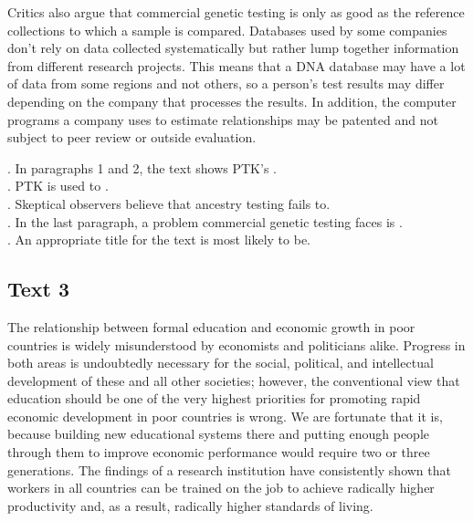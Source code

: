 Critics also argue that commercial genetic testing is only as good as the reference collections to which a sample is compared. Databases used by some companies don’t rely on data collected systematically but rather lump together information from different research projects. This means that a DNA database may have a lot of data from some regions and not others, so a person’s test results may differ depending on the company that processes the results. In addition, the computer programs a company uses to estimate relationships may be patented and not subject to peer review or outside evaluation.
\begin{questions} . In paragraphs 1 and 2, the text shows PTK’s \ltk{}.
\\ . PTK is used to \ltk{}.
\\ . Skeptical observers believe that ancestry testing fails to\ltk{}.
\\ . In the last paragraph, a problem commercial genetic testing faces is \ltk{}.
\\ . An appropriate title for the text is most likely to be\ltk{}.
\\ \end{questions}      \subsection{Text 3}
The relationship between formal education and economic growth in poor countries is widely misunderstood by economists and politicians alike. Progress in both areas is undoubtedly necessary for the social, political, and intellectual development of these and all other societies; however, the conventional view that education should be one of the very highest priorities for promoting rapid economic development in poor countries is wrong. We are fortunate that it is, because building new educational systems there and putting enough people through them to improve economic performance would require two or three generations. The findings of a research institution have consistently shown that workers in all countries can be trained on the job to achieve radically higher productivity and, as a result, radically higher standards of living.
